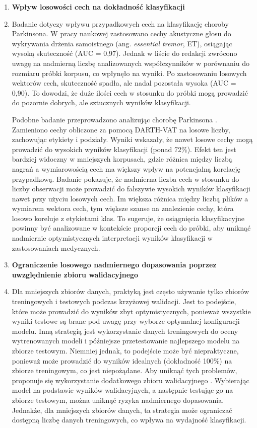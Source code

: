 \begin{enumerate}[label={\alph*)}]
  	\item \textbf{Wpływ losowości cech na dokładność klasyfikacji}
	\item[] Badanie dotyczy wpływu przypadkowych cech na klasyfikację choroby Parkinsona.
W pracy naukowej \cite{Essential_tremor_problematic_methodology} zastosowano cechy akustyczne głosu do wykrywania drżenia samoistnego (ang. \emph{essential tremor}, ET),
osiągając wysoką skuteczność (AUC = 0,97). Jednak w liście do redakcji zwrócono uwagę na nadmierną liczbę analizowanych współczynników w
porównaniu do rozmiaru próbki korpusu, co wpłynęło na wyniki.
Po zastosowaniu losowych wektorów cech, skuteczność spadła, ale nadal pozostała wysoka (AUC = 0,90).
To dowodzi, że duże ilości cech w stosunku do próbki mogą prowadzić do pozornie dobrych, ale sztucznych wyników klasyfikacji.

Podobne badanie przeprowadzono analizując chorobę Parkinsona \cite{SustainedVowelsProblems}.
Zamieniono cechy obliczone za pomocą DARTH-VAT na losowe liczby, zachowując etykiety i podziały.
Wyniki wskazały, że nawet losowe cechy mogą prowadzić do wysokich wyników klasyfikacji (ponad 72\%).
Efekt ten jest bardziej widoczny w mniejszych korpusach, gdzie różnica między liczbą nagrań a wymiarowością cech ma większy wpływ na potencjalną korelację przypadkową.
Badanie pokazuje, że nadmierna liczba cech w stosunku do liczby obserwacji może prowadzić do fałszywie wysokich wyników klasyfikacji nawet przy użyciu losowych cech.
Im większa różnica między liczbą plików a wymiarem wektora cech, tym większe szanse na znalezienie cechy, która losowo koreluje z etykietami klas.
To sugeruje, że osiągnięcia klasyfikacyjne powinny być analizowane w kontekście proporcji cech do próbki, aby uniknąć nadmiernie optymistycznych interpretacji wyników klasyfikacji w zastosowaniach medycznych.

  	\item \textbf{Ograniczenie losowego nadmiernego dopasowania poprzez uwzględnienie zbioru walidacyjnego}
	\item[] Dla mniejszych zbiorów danych, praktyką jest często używanie tylko zbiorów treningowych i testowych podczas krzyżowej walidacji.
Jest to podejście, które może prowadzić do wyników zbyt optymistycznych, ponieważ wszystkie wyniki testowe są brane pod uwagę przy wyborze optymalnej
konfiguracji modelu.
Inną strategią jest wykorzystanie danych treningowych do oceny wytrenowanych modeli i późniejsze przetestowanie najlepszego modelu na zbiorze testowym.
Niemniej jednak, to podejście może być niepraktyczne, ponieważ może prowadzić do wyników idealnych (dokładność 100\%) na zbiorze treningowym, co jest niepożądane.
Aby uniknąć tych problemów, proponuje się wykorzystanie dodatkowego zbioru walidacyjnego \cite{SustainedVowelsProblems}.
Wybierając model na podstawie wyników walidacyjnych, a następnie testując go na zbiorze testowym, można uniknąć ryzyka nadmiernego dopasowania.
Jednakże, dla mniejszych zbiorów danych, ta strategia może ograniczać dostępną liczbę danych treningowych, co wpływa na wydajność klasyfikacji.


\end{enumerate}
